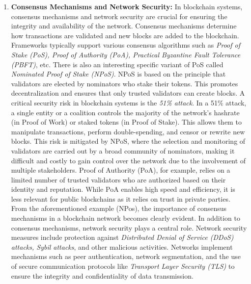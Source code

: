 \begin{enumerate}[label=\textbullet]
	\item\textbf{Consensus Mechanisms and Network Security:}\cite{sub_consens}\cite{polkadot_paper}
	In blockchain systems, consensus mechanisms and network security are crucial for ensuring the integrity and availability of the network. Consensus mechanisms determine how transactions are validated and new blocks are added to the blockchain. Frameworks typically support various consensus algorithms such as \textit{Proof of Stake (PoS), Proof of Authority (PoA), Practical Byzantine Fault Tolerance (PBFT)}, etc.
	There is also an interesting specific variant of PoS called \textit{Nominated Proof of Stake (NPoS)}. NPoS is based on the principle that validators are elected by nominators who stake their tokens. This promotes decentralization and ensures that only trusted validators can create blocks. A critical security risk in blockchain systems is the \textit{51\% attack}. In a 51\% attack, a single entity or a coalition controls the majority of the network's hashrate (in Proof of Work) or staked tokens (in Proof of Stake). This allows them to manipulate transactions, perform double-spending, and censor or rewrite new blocks. This risk is mitigated by NPoS, where the selection and monitoring of validators are carried out by a broad community of nominators, making it difficult and costly to gain control over the network due to the involvement of multiple stakeholders.
	Proof of Authority (PoA), for example, relies on a limited number of trusted validators who are authorized based on their identity and reputation. While PoA enables high speed and efficiency, it is less relevant for public blockchains as it relies on trust in private parties. From the aforementioned example (NPos), the importance of consensus mechanisms in a blockchain network becomes clearly evident.
	In addition to consensus mechanisms, network security plays a central role. Network security measures include protection against \textit{Distributed Denial of Service (DDoS) attacks, Sybil attacks}, and other malicious activities. Networks implement mechanisms such as peer authentication, network segmentation, and the use of secure communication protocols like \textit{Transport Layer Security (TLS)} to ensure the integrity and confidentiality of data transmission.


\end{enumerate}
